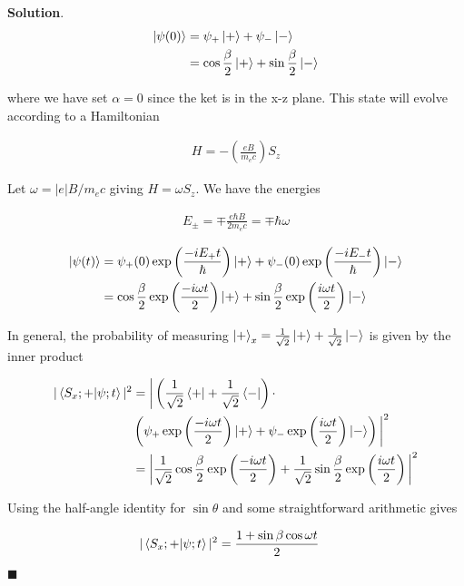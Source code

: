 \documentclass[12pt]{article}
\theoremstyle{definition}
\newenvironment{s}{%
        \begin{trivlist} \item \textbf{Solution}. }{%
            \hspace*{\fill} $\blacksquare$\end{trivlist}}%
\begin{document}
{\begin{s}
\begin{align*}
\ket{\psi(0)} &= \psi_{+}\ket{+} + \psi_{-}\ket{-}\\
&= \cos{\frac{\beta}{2}}\ket{+} + \sin{\frac{\beta}{2}}\ket{-}\\
\end{align*}

where we have set $\alpha=0$ since the ket is in the x-z plane. This state will evolve according to a Hamiltonian

\begin{align*}
H = -\left(\frac{eB}{m_{e}c}\right)S_{z}
\end{align*}

Let $\omega = |e|B/m_{e}c$ giving $H=\omega S_{z}$. We have the energies

\begin{align*}
E_{\pm} = \mp \frac{e\hbar B}{2m_{e}c} = \mp \hbar\omega
\end{align*}

\begin{align*}
\ket{\psi(t)} &= \psi_{+}(0)\exp\left(\frac{-iE_{+}t}{\hbar}\right)\ket{+} + \psi_{-}(0)\exp\left(\frac{-iE_{-}t}{\hbar}\right)\ket{-}\\
&= \cos{\frac{\beta}{2}}\exp\left(\frac{-i\omega t}{2}\right)\ket{+} + \sin{\frac{\beta}{2}}\exp\left(\frac{i\omega t}{2}\right)\ket{-}
\end{align*}

In general, the probability of measuring $\ket{+}_{x} = \frac{1}{\sqrt{2}}\ket{+} + \frac{1}{\sqrt{2}}\ket{-}$ is given by the inner product

\begin{align*}
|\bra{S_{x};+}\ket{\psi;t}|^{2} &= \bigg|\left(\frac{1}{\sqrt{2}}\bra{+} + \frac{1}{\sqrt{2}}\bra{-}\right)\cdot\\
&\left(\psi_{+}\exp\left(\frac{-i\omega t}{2}\right)\ket{+} + \psi_{-}\exp\left(\frac{i\omega t}{2}\right)\ket{-}\right)\bigg|^{2}\\
&= \bigg|\frac{1}{\sqrt{2}}\cos\frac{\beta}{2}\exp\left(\frac{-i\omega t}{2}\right)+\frac{1}{\sqrt{2}}\sin\frac{\beta}{2}\exp\left(\frac{i\omega t}{2}\right)\bigg|^{2}
\end{align*}

Using the half-angle identity for $\sin\theta$ and some straightforward arithmetic gives

\begin{align*}
|\bra{S_{x};+}\ket{\psi;t}|^{2} &= \frac{1+\sin\beta\cos\omega t}{2}
\end{align*}



\end{s}}
\end{document}
